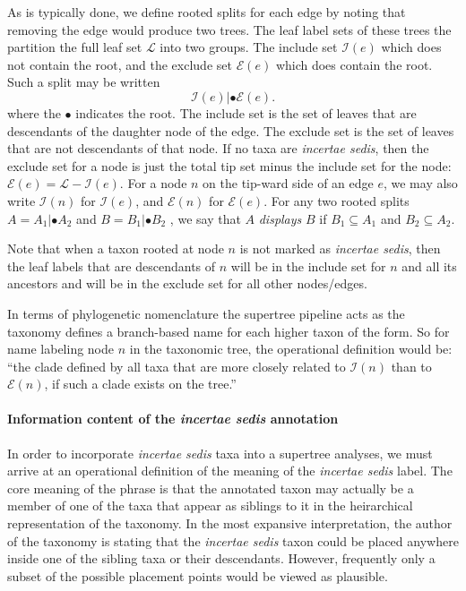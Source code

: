 \documentclass[english]{article}
\begin{document}
As is typically done, we define rooted splits for each edge by
noting that removing the edge
would produce two trees.
The leaf label sets of these trees the
partition the full leaf set $\mathcal{L}$ into two groups.
The include
set $\mathcal{I}(e)$ which does not contain the root, and the exclude
set $\mathcal{E}(e)$ which does contain the root.
Such a split may be
written \[ \mathcal{I}(e)|\bullet\mathcal{E}(e).\] where the
$\bullet$ indicates the root.
The include set is the set of leaves
that are descendants of the daughter node of the edge.
The exclude set
is the set of leaves that are not descendants of that node.
If no taxa
are \emph{incertae sedis}, then the exclude set for a node is just the
total tip set minus the include set for the node:
$\mathcal{E}(e)  =\mathcal{L}-\mathcal{I}(e)$.
For a node $n$ on the tip-ward side of an edge $e$, we may also write
$\mathcal{I}(n)$ for $\mathcal{I}(e)$, and $\mathcal{E}(n)$ for
$\mathcal{E}(e)$.
For any two rooted splits $A=A_{1}|\bullet A_{2}$
and $B=B_{1}|\bullet B_{2}$ , we say that $A$ \emph{displays }$B$ if
$B_{1}\subseteq A_{1}$ and $B_{2}\subseteq A_{2}$.

Note that when a taxon rooted at node $n$ is not marked as
\emph{incertae sedis}, then the leaf labels that are descendants of
$n$ will be in the include set for $n$ and all its ancestors and will
be in the exclude set for all other nodes/edges.

In terms of phylogenetic nomenclature the supertree pipeline acts as
    the taxonomy defines a branch-based name \citep[see][]{deQueiroz2013}
    for each higher taxon of the form.
So for name labeling node $n$ in the taxonomic tree, 
    the operational definition would be:
    ``the clade defined by all taxa
    that are more closely related to $\mathcal{I}(n)$ than to
    $\mathcal{E}(n)$, if such a clade exists on the tree.''


\paragraph{Information content of the \emph{incertae sedis} annotation}

In order to incorporate \emph{incertae sedis }taxa into a supertree
analyses, we must arrive at an operational definition of the meaning
of the \emph{incertae sedis} label.
The core meaning of the phrase is
that the annotated taxon may actually be a member of one of the taxa
that appear as siblings to it in the heirarchical representation of
the taxonomy.
In the most expansive interpretation, the author of the
taxonomy is stating that the \emph{incertae sedis} taxon could be
placed anywhere inside one of the sibling taxa or their descendants.
However, frequently only a subset of the possible placement points
would be viewed as plausible.
\end{document}
